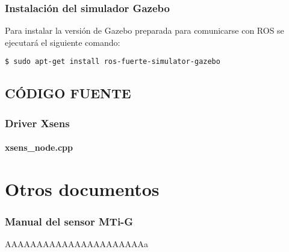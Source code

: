 \documentclass[10pt, a4paper]{report}
\begin{document}
\section{Instalación del simulador Gazebo}

Para instalar la versión de Gazebo preparada para comunicarse con ROS se ejecutará el siguiente comando:

\begin{verbatim}
$ sudo apt-get install ros-fuerte-simulator-gazebo
\end{verbatim}


\chapter{CÓDIGO FUENTE}

\section{Driver Xsens}

\subsection{xsens\_node.cpp}
%
\newpage

\part{Otros documentos}

\section{Manual del sensor MTi-G}

%
AAAAAAAAAAAAAAAAAAAAAAa
\end{document}
